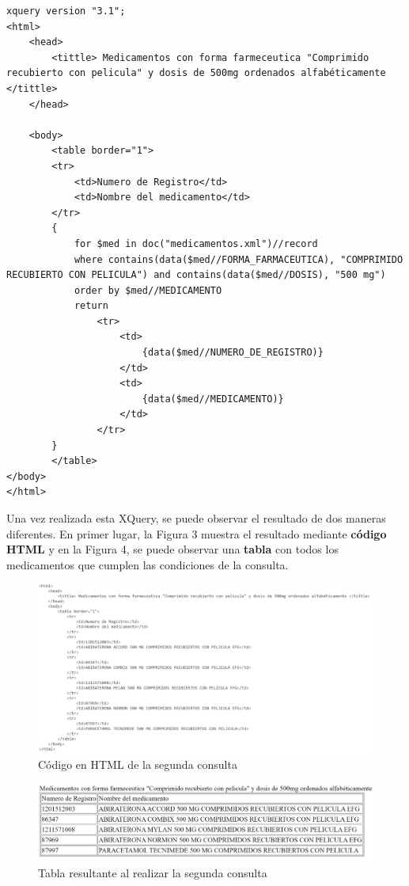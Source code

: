 \documentclass[../main.tex]{subfiles}
\begin{document}
\begin{lstlisting}
xquery version "3.1";
<html>
    <head>
        <tittle> Medicamentos con forma farmeceutica "Comprimido recubierto con pelicula" y dosis de 500mg ordenados alfabéticamente </tittle>
    </head>
    
    <body>
        <table border="1">
        <tr>
            <td>Numero de Registro</td>
            <td>Nombre del medicamento</td>
        </tr>
        {
            for $med in doc("medicamentos.xml")//record
            where contains(data($med//FORMA_FARMACEUTICA), "COMPRIMIDO RECUBIERTO CON PELICULA") and contains(data($med//DOSIS), "500 mg")
            order by $med//MEDICAMENTO
            return 
                <tr> 
                    <td> 
                        {data($med//NUMERO_DE_REGISTRO)}
                    </td>
                    <td>
                        {data($med//MEDICAMENTO)}
                    </td>
                </tr>
        }
        </table>
</body>
</html>

\end{lstlisting}

Una vez realizada esta XQuery, se puede observar el resultado de dos maneras diferentes. En primer lugar, la Figura 3 muestra el resultado mediante \textbf{código HTML} y en la Figura 4, se puede observar una \textbf{tabla} con todos los medicamentos que cumplen las condiciones de la consulta.

\begin{figure}[h]
    \centering
    \includegraphics[scale=0.25]{images/xquery_2_html.png}
    \caption{Código en HTML de la segunda consulta}
    \label{fig:mesh1}
\end{figure}

\begin{figure}[h]
    \centering
    \includegraphics[scale=0.25]{images/xquery_2_output.png}
    \caption{Tabla resultante al realizar la segunda consulta}
    \label{fig:mesh1}
\end{figure}
\end{document}
